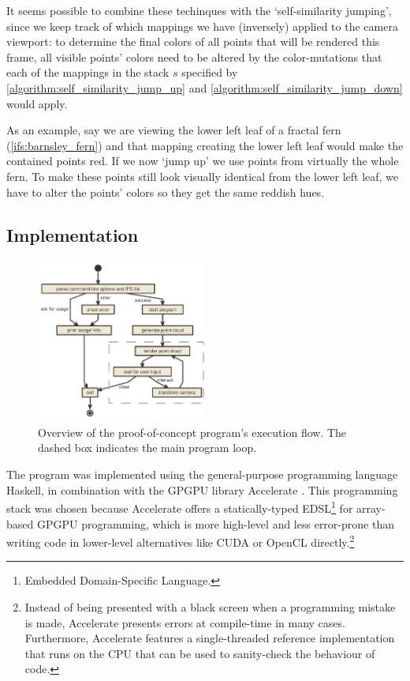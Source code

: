 \documentclass[11pt]{article}
\begin{document}
It seems possible to combine these techinques with the `self-similarity jumping', since we keep track of which mappings we have (inversely) applied to the camera viewport:
to determine the final colors of all points that will be rendered this frame, 
all visible points' colors need to be altered by the color-mutations that each of the mappings in the stack \(s\) specified by \autoref{algorithm:self_similarity_jump_up} and \autoref{algorithm:self_similarity_jump_down} would apply.

As an example, say we are viewing the lower left leaf of a fractal fern (\autoref{ifs:barnsley_fern}) and that mapping creating the lower left leaf would make the contained points red. 
If we now `jump up' we use points from virtually the whole fern.
To make these points still look visually identical from the lower left leaf, we have to alter the points' colors so they get the same reddish hues.

\subsection{Implementation}
\label{sec:org2830548}

\begin{figure}
  \centering
  \includegraphics[width=0.5\textwidth]{figures/program_execution}
  \caption{Overview of the proof-of-concept program's execution flow. The dashed box indicates the main program loop.}
\label{figure:program_flow}
\end{figure}

The program was implemented using the general-purpose programming language Haskell, 
in combination with the GPGPU library Accelerate \cite{chakravarty2011accelerating}.
This programming stack was chosen because Accelerate 
offers a statically-typed EDSL\footnote{Embedded Domain-Specific Language.} for array-based GPGPU programming,
which is more high-level and less error-prone than writing code 
in lower-level alternatives like CUDA or OpenCL directly.\footnote{Instead of being presented with a black screen when a programming mistake is made, 
Accelerate presents errors at compile-time in many cases. Furthermore, Accelerate features a
single-threaded reference implementation that runs on the CPU that can be used to sanity-check the behaviour of code.}
\end{document}
